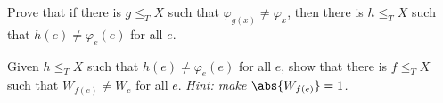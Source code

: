 \begin{problem}
  \begin{enumalph}
    \item Prove that if there is $g \leq_T X$ such that
      $\varphi_{g(x)} \neq \varphi_x$, then there is
      $h \leq_T X$ such that $h(e) \neq \varphi_e(e)$
      for all $e$.

      \begin{answer}

      \end{answer}

    \item Given $h \leq_T X$ such that $h(e) \neq \varphi_e(e)$ for all $e$,
      show that there is $f \leq_T X$ such that $W_{f(e)} \neq W_e$
      for all $e$. \newline
      \emph{Hint: make $\abs{W_{f(e)}} = 1$.}

      \begin{answer}

      \end{answer}
  \end{enumalph}
\end{problem}
